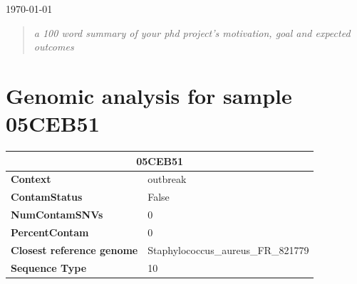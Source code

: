 \documentclass[a4paper]{article}
\begin{document}
\begin{titlepage}

{\large \today}\\[0.5cm] %

\vfill %






\end{titlepage}

\renewcommand{\abstractname}{Summary}
\begin{abstract}
\emph{a 100 word summary of your phd project's motivation, goal and expected outcomes}
\end{abstract}

\section{Genomic analysis for sample 05CEB51} %

{\renewcommand{\arraystretch}{1.5} %
{\setlength{\tabcolsep}{1cm} %
\centering
\begin{tabular}{|l|l|}
  \hline
  \multicolumn{2}{|c|}{\textbf{05CEB51}} \\ %
  \hline
  \textbf{Context} & outbreak \\%
  \hline
  \textbf{ContamStatus} & False \\%
  \textbf{NumContamSNVs} & 0 \\%
  \textbf{PercentContam} & 0 \\%
  \hline
  \textbf{Closest reference genome} & Staphylococcus\_aureus\_FR\_821779 \\%
  \textbf{Sequence Type} & 10 \\%
  \hline
\end{tabular}\\
}}
\end{document}
